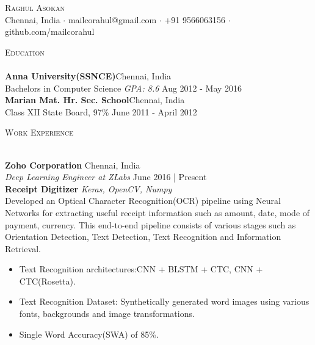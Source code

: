 \documentclass[a4paper]{article}
\newcommand{\lineunder} {
    \vspace*{-8pt} \\
    \hspace*{-18pt} \hrulefill \\
}
\newcommand{\header} [1] {
    {\hspace*{-18pt}\vspace*{6pt} \textsc{#1}}
    \vspace*{-6pt} \lineunder
}
\begin{document}
\vspace*{-40pt}

    

\vspace*{-10pt}
\begin{center}
	{\Huge \scshape {Raghul Asokan}}\\
	Chennai, India $\cdot$ mailcorahul@gmail.com $\cdot$ +91 9566063156 $\cdot$ github.com/mailcorahul\\
\end{center}

\header{Education}
\textbf{Anna University(SSNCE)}\hfill Chennai, India\\
Bachelor\textquotesingle{}s in Computer Science \textit{GPA: 8.6} \hfill Aug 2012 - May 2016\\
\vspace{2mm}
\textbf{Marian Mat. Hr. Sec. School}\hfill Chennai, India\\
Class XII State Board, 97\% \hfill June 2011 - April 2012\\
\vspace{2mm}

\header{Work Experience}
\vspace{1mm}

\textbf{Zoho Corporation} \hfill Chennai, India\\
\textit{Deep Learning Engineer at ZLabs} \hfill June 2016 | Present\\
\vspace*{2mm}
{\textbf{Receipt Digitizer}} {\sl Keras, OpenCV, Numpy} \\
Developed an Optical Character Recognition(OCR) pipeline using Neural Networks for extracting useful receipt information such as amount, date, mode of payment, currency. This end-to-end pipeline consists of various stages such as Orientation Detection, Text Detection, Text Recognition and Information Retrieval.\\            
            \begin{itemize}
                \itemsep-0.5em
                \item Text Recognition architectures:CNN + BLSTM + CTC, CNN + CTC(Rosetta).
                \item Text Recognition Dataset: Synthetically generated word images using various fonts, backgrounds and image transformations.
                \item Single Word Accuracy(SWA) of 85\%.
            \end{itemize}
\end{document}
